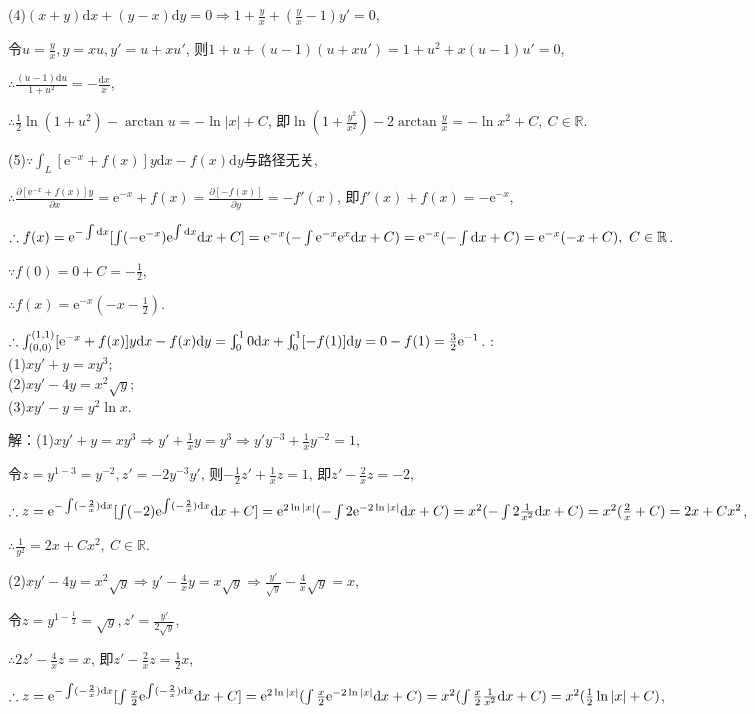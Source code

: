 \documentclass[12pt,UTF8,fleqn]{ctexart}
\newcommand{\Int}[4]{\varint\nolimits_{#1}^{#2}#3\mathrm d#4}
\newcommand{\md}[1]{\mathrm d#1}
\newcommand{\ppx}[1]{\frac{\partial #1}{\partial x}}
\newcommand{\ppy}[1]{\frac{\partial #1}{\partial y}}
\newcommand{\me}[0]{\mathrm e}
\begin{document}
\begin{enumerate}
(4)$(x+y)\md x+(y-x)\md y=0\Rightarrow1+\frac yx+(\frac yx-1)y'=0$,

令$u=\frac yx,y=xu,y'=u+xu'$, 则$1+u+(u-1)(u+xu')=1+u^2+x(u-1)u'=0$,

$\therefore\frac{(u-1)\md u}{1+u^2}=-\frac{\md x}x$,

$\therefore\frac12\ln(1+u^2)-\arctan u=-\ln|x|+C$, 即$\ln(1+\frac{y^2}{x^2})-2\arctan\frac yx=-\ln x^2+C,\ C\in\mathbb R$.

(5)$\because\int_L[\me^{-x}+f(x)]y\md x-f(x)\md y$与路径无关,

$\therefore\ppx{[\me^{-x}+f(x)]y}=\me^{-x}+f(x)=\ppy{[-f(x)]}=-f'(x)$, 即$f'(x)+f(x)=-\me^{-x}$,

$\therefore f(x)=\me^{-\int\md x}[\int(-\me^{-x})\me^{\int\md x}\md x+C]=\me^{-x}(-\int\me^{-x}\me^x\md x+C)=\me^{-x}(-\int\md x+C)\\
=\me^{-x}(-x+C),\ C\in\mathbb R$.

$\because f(0)=0+C=-\frac12$,

$\therefore f(x)=\me^{-x}(-x-\frac12)$.

$\therefore\int_{(0,0)}^{(1,1)}[\me^{-x}+f(x)]y\md x-f(x)\md y=\Int010x+\Int01{[-f(1)]}y=0-f(1)=\frac32\me^{-1}$.
:\\
(1)$xy'+y=xy^3$;\\
(2)$xy'-4y=x^2\sqrt y$;\\
(3)$xy'-y=y^2\ln x$.

解：(1)$xy'+y=xy^3\Rightarrow y'+\frac1xy=y^3\Rightarrow y'y^{-3}+\frac1xy^{-2}=1$,

令$z=y^{1-3}=y^{-2},z'=-2y^{-3}y'$, 则$-\frac12z'+\frac1xz=1$, 即$z'-\frac2xz=-2$,

$\therefore z=\me^{-\int(-\frac2x)\md x}[\int(-2)\me^{\int(-\frac2x)\md x}\md x+C]=\me^{2\ln|x|}(-\int2\me^{-2\ln|x|}\md x+C)\\
=x^2(-\int2\frac1{x^2}\md x+C)=x^2(\frac2x+C)=2x+Cx^2$,

$\therefore\frac1{y^2}=2x+Cx^2,\ C\in\mathbb R$.

(2)$xy'-4y=x^2\sqrt y\Rightarrow y'-\frac4xy=x\sqrt y\Rightarrow\frac{y'}{\sqrt y}-\frac4x\sqrt y=x$,

令$z=y^{1-\frac12}=\sqrt y,z'=\frac{y'}{2\sqrt y}$,

$\therefore2z'-\frac4xz=x$, 即$z'-\frac2xz=\frac12x$,

$\therefore z=\me^{-\int(-\frac2x)\md x}[\int\frac x2\me^{\int(-\frac2x)\md x}\md x+C]=\me^{2\ln|x|}(\int\frac x2\me^{-2\ln|x|}\md x+C)=x^2(\int\frac x2\frac1{x^2}\md x+C)\\
=x^2(\frac12\ln|x|+C)$,


\end{enumerate}
\end{document}

